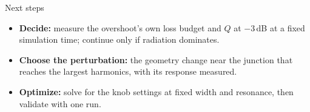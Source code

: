 \documentclass[11pt, aspectratio=169]{beamer}
\begin{document}
\begin{frame}{Next steps}
    \begin{itemize}
        \setlength{\itemsep}{0.30cm}
        \item \textbf{Decide:} measure the overshoot's own loss budget and $Q$ at $-3$\,dB at a fixed simulation time; continue only if radiation dominates.
        \item \textbf{Choose the perturbation:} the geometry change near the junction that reaches the largest harmonics, with its response measured.
        \item \textbf{Optimize:} solve for the knob settings at fixed width and resonance, then validate with one run.
    \end{itemize}
\end{frame}
\end{document}
